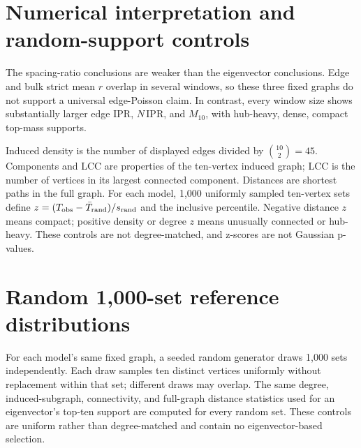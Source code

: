 \documentclass[10pt,letterpaper]{article}
\begin{document}
\section{Numerical interpretation and random-support controls}
The spacing-ratio conclusions are weaker than the eigenvector conclusions. Edge and bulk strict mean $r$ overlap in several windows, so these three fixed graphs do not support a universal edge-Poisson claim. In contrast, every window size shows substantially larger edge IPR, $N\,\mathrm{IPR}$, and $M_{10}$, with hub-heavy, dense, compact top-mass supports.

Induced density is the number of displayed edges divided by $\binom{10}{2}=45$. Components and LCC are properties of the ten-vertex induced graph; LCC is the number of vertices in its largest connected component. Distances are shortest paths in the full graph. For each model, 1,000 uniformly sampled ten-vertex sets define $z=(T_{\rm obs}-\bar T_{\rm rand})/s_{\rm rand}$ and the inclusive percentile. Negative distance $z$ means compact; positive density or degree $z$ means unusually connected or hub-heavy. These controls are not degree-matched, and z-scores are not Gaussian p-values.
\begingroup\section{Random 1,000-set reference distributions}
For each model's same fixed graph, a seeded random generator draws 1,000 sets independently.
Each draw samples ten distinct vertices uniformly without replacement within that set; different
draws may overlap. The same degree, induced-subgraph, connectivity, and full-graph distance
statistics used for an eigenvector's top-ten support are computed for every random set. These
controls are uniform rather than degree-matched and contain no eigenvector-based selection.
\end{document}
